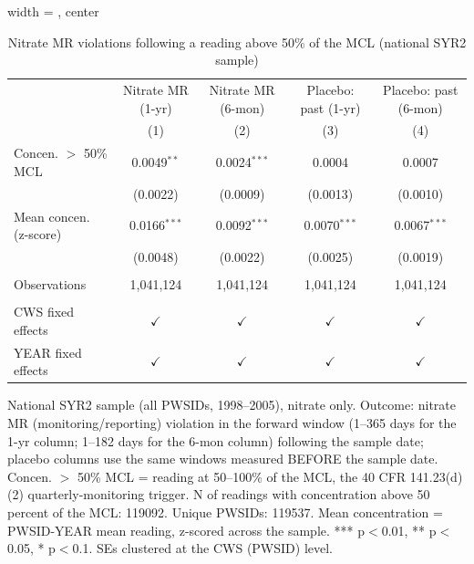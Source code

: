 
\begin{table}[htbp]
\caption{Nitrate MR violations following a reading above 50\% of the MCL (national SYR2 sample)}\label{tab:mr_concentration_lag_national}
\centering
\begin{adjustbox}{width = \textwidth, center}
   \begin{tabular}{lcccc}
      \toprule    
                          & Nitrate MR (1-yr) & Nitrate MR (6-mon)  & Placebo: past (1-yr) & Placebo: past (6-mon) \\   
                          & (1)               & (2)                 & (3)                  & (4)\\  
      \midrule 
      Concen. $>$ 50\% MCL           & 0.0049$^{**}$     & 0.0024$^{***}$      & 0.0004               & 0.0007\\   
                          & (0.0022)          & (0.0009)            & (0.0013)             & (0.0010)\\   
      Mean concen. (z-score)       & 0.0166$^{***}$    & 0.0092$^{***}$      & 0.0070$^{***}$       & 0.0067$^{***}$\\   
                          & (0.0048)          & (0.0022)            & (0.0025)             & (0.0019)\\   
       \\
      Observations        & 1,041,124         & 1,041,124           & 1,041,124            & 1,041,124\\  
       \\
      CWS fixed effects & $\checkmark$      & $\checkmark$        & $\checkmark$         & $\checkmark$\\   
      YEAR fixed effects  & $\checkmark$      & $\checkmark$        & $\checkmark$         & $\checkmark$\\   
      \bottomrule
   \end{tabular}
\end{adjustbox}
{\tiny\linespread{1}\selectfont \par \raggedright National SYR2 sample (all PWSIDs, 1998--2005), nitrate only. Outcome: nitrate MR (monitoring/reporting) violation in the forward window (1--365 days for the 1-yr column; 1--182 days for the 6-mon column) following the sample date; placebo columns use the same windows measured BEFORE the sample date. Concen. $>$ 50\% MCL = reading at 50--100\% of the MCL, the 40 CFR 141.23(d)(2) quarterly-monitoring trigger. N of readings with concentration above 50 percent of the MCL: 119092. Unique PWSIDs: 119537. Mean concentration = PWSID-YEAR mean reading, z-scored across the sample. *** p$<$0.01, ** p$<$0.05, * p$<$0.1. SEs clustered at the CWS (PWSID) level.}
\end{table}

